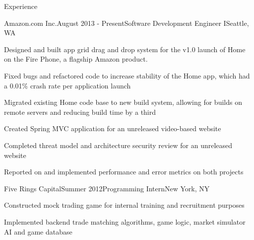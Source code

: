 \documentclass{resume} %
\begin{document}



\begin{rSection}{Experience}

\begin{rSubsection}{Amazon.com Inc.}{August 2013 - Present}{Software Development Engineer I}{Seattle, WA}
\item Designed and built app grid drag and drop system for the v1.0 launch of Home on the Fire Phone, a flagship Amazon product.
\item Fixed bugs and refactored code to increase stability of the Home app, which had a 0.01\% crash rate per application launch
\item Migrated existing Home code base to new build system, allowing for builds on remote servers and reducing build time by a third
\item Created Spring MVC application for an unreleased video-based website
\item Completed threat model and architecture security review for an unreleased website
\item Reported on and implemented performance and error metrics on both projects
\end{rSubsection}


\begin{rSubsection}{Five Rings Capital}{Summer 2012}{Programming Intern}{New York, NY}
\item Constructed mock trading game for internal training and recruitment purposes
\item Implemented backend trade matching algorithms, game logic, market simulator AI and game database
\end{rSubsection}


\end{rSection}
\end{document}
